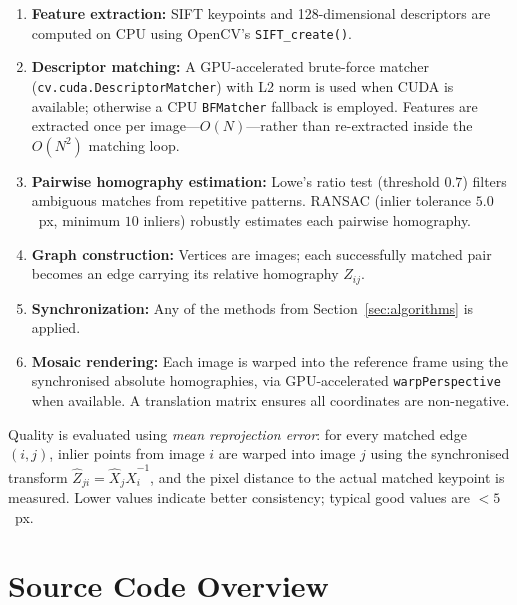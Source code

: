 \documentclass[11pt, a4paper]{article}
\begin{document}
\begin{enumerate}[leftmargin=*]
    \item \textbf{Feature extraction:} SIFT keypoints and 128-dimensional
          descriptors are computed on CPU using OpenCV's \texttt{SIFT\_create()}.

    \item \textbf{Descriptor matching:} A GPU-accelerated brute-force matcher
          (\texttt{cv.cuda.DescriptorMatcher}) with L2 norm is used when CUDA is
          available; otherwise a CPU \texttt{BFMatcher} fallback is employed.
          Features are extracted once per image---$O(N)$---rather than
          re-extracted inside the $O(N^2)$ matching loop.

    \item \textbf{Pairwise homography estimation:} Lowe's ratio test (threshold
          $0.7$) filters ambiguous matches from repetitive patterns.  RANSAC
          (inlier tolerance $5.0$~px, minimum $10$ inliers) robustly estimates
          each pairwise homography.

    \item \textbf{Graph construction:} Vertices are images; each successfully
          matched pair becomes an edge carrying its relative homography $Z_{ij}$.

    \item \textbf{Synchronization:} Any of the methods from
          Section~\ref{sec:algorithms} is applied.

    \item \textbf{Mosaic rendering:} Each image is warped into the reference
          frame using the synchronised absolute homographies, via
          GPU-accelerated \texttt{warpPerspective} when available.  A
          translation matrix ensures all coordinates are non-negative.
\end{enumerate}

Quality is evaluated using \emph{mean reprojection error}: for every matched
edge $(i,j)$, inlier points from image $i$ are warped into image $j$ using the
synchronised transform $\hat{Z}_{ji} = \hat{X}_j \hat{X}_i^{-1}$, and the
pixel distance to the actual matched keypoint is measured.  Lower values
indicate better consistency; typical good values are $< 5$~px.

\section{Source Code Overview}
\label{sec:code}
\end{document}
